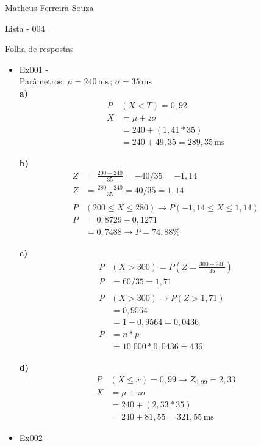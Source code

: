\documentclass[fleqn, 12pt]{article}
\begin{document}
\hfill Matheus Ferreira Souza 

\hfill Lista - 004

\hfill Folha de respostas


\begin{itemize}
\item[1)] Ex001 -\\Parâmetros: $\mu = 240\,\text{ms}\,;\,\sigma=35\,\text{ms}$\\

\textbf{a)}
\begin{align*}
    P&(X<T) = 0,92\\
    X&= \mu + z\sigma\\
    &= 240 + (1,41 * 35)\\
    &= 240 +49,35 = 289,35\,\text{ms}
\end{align*}


\textbf{b)}
\begin{align*}
    Z &= \frac{200 - 240}{35}= -40/35 = - 1,14\\
    Z&= \frac{280 - 240}{35}= 40/35 = 1,14\\\\
    P&(200 \leq X \leq 280) \rightarrow P(-1,14 \leq X \leq 1,14)\\
    P&= 0,8729 - 0,1271\\
    &=0,7488 \rightarrow P = 74,88\%
\end{align*}


\textbf{c)}
\begin{align*}
    P&(X > 300) = P\left(Z = \frac{300 - 240}{35}\right)\\
    P&= 60/35 = 1,71\\\\
    P&(X > 300) \rightarrow P(Z > 1,71)\\
    &= 0,9564\\
    &=1 - 0,9564 = 0,0436\\
    P&=n * p\\
    &= 10.000 * 0,0436 = 436
\end{align*}


\textbf{d)}
\begin{align*}
    P&(X \leq x) = 0,99 \rightarrow Z_{0,99} = 2,33\\
    X &= \mu + z\sigma\\
    &= 240 + (2,33 * 35)\\
    &= 240 + 81,55 = 321,55\,\text{ms}
\end{align*}

\item[2)] Ex002 -\\


\end{itemize}
\end{document}
